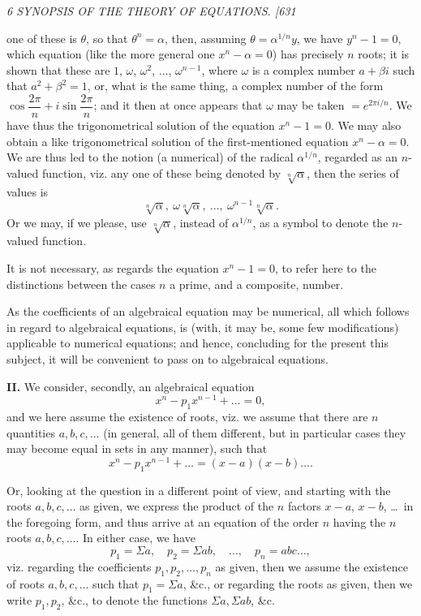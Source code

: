 \documentclass[12pt,a4paper]{article}
\begin{document}
\clearpage
\setcounter{page}{6}

\begin{center}
\textit{6 \hfill SYNOPSIS OF THE THEORY OF EQUATIONS. \hfill [631}
\end{center}

\noindent one of these is $\theta$, so that $\theta^n = \alpha$, then, assuming $\theta = \alpha^{1/n} y$, we have $y^n - 1 = 0$, which equation (like the more general one $x^n - \alpha = 0$) has precisely $n$ roots; it is shown that these are $1$, $\omega$, $\omega^2$, $\ldots$, $\omega^{n-1}$, where $\omega$ is a complex number $a + \beta i$ such that $a^2 + \beta^2 = 1$, or, what is the same thing, a complex number of the form $\cos\dfrac{2\pi}{n} + i\sin\dfrac{2\pi}{n}$; and it then at once appears that $\omega$ may be taken $= e^{2\pi i/n}$. We have thus the trigonometrical solution of the equation $x^n - 1 = 0$. We may also obtain a like trigonometrical solution of the first-mentioned equation $x^n - \alpha = 0$. We are thus led to the notion (a numerical) of the radical $\alpha^{1/n}$, regarded as an $n$-valued function, viz. any one of these being denoted by $\sqrt[n]{\alpha}$, then the series of values is
\[
\sqrt[n]{\alpha},\ \omega\sqrt[n]{\alpha},\ \ldots,\ \omega^{n-1}\sqrt[n]{\alpha}.
\]
Or we may, if we please, use $\sqrt[n]{\alpha}$, instead of $\alpha^{1/n}$, as a symbol to denote the $n$-valued function.

It is not necessary, as regards the equation $x^n - 1 = 0$, to refer here to the distinctions between the cases $n$ a prime, and a composite, number.

As the coefficients of an algebraical equation may be numerical, all which follows in regard to algebraical equations, is (with, it may be, some few modifications) applicable to numerical equations; and hence, concluding for the present this subject, it will be convenient to pass on to algebraical equations.

\medskip\noindent\textbf{II.} We consider, secondly, an algebraical equation
\[
x^n - p_1 x^{n-1} + \ldots = 0,
\]
and we here assume the existence of roots, viz. we assume that there are $n$ quantities $a, b, c, \ldots$ (in general, all of them different, but in particular cases they may become equal in sets in any manner), such that
\[
x^n - p_1 x^{n-1} + \ldots = (x-a)(x-b)\ldots.
\]

Or, looking at the question in a different point of view, and starting with the roots $a, b, c, \ldots$ as given, we express the product of the $n$ factors $x-a$, $x-b$, \ldots\ in the foregoing form, and thus arrive at an equation of the order $n$ having the $n$ roots $a, b, c, \ldots$. In either case, we have
\[
p_1 = \Sigma a, \quad p_2 = \Sigma a b, \quad \ldots, \quad p_n = a b c \ldots,
\]
viz. regarding the coefficients $p_1, p_2, \ldots, p_n$ as given, then we assume the existence of roots $a, b, c, \ldots$ such that $p_1 = \Sigma a$, \&c., or regarding the roots as given, then we write $p_1, p_2$, \&c., to denote the functions $\Sigma a, \Sigma a b$, \&c.
\end{document}
